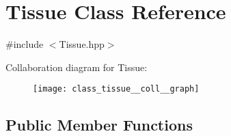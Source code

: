\hypertarget{class_tissue}{}\section{Tissue Class Reference}
\label{class_tissue}


{\ttfamily \#include $<$Tissue.\+hpp$>$}



Collaboration diagram for Tissue\+:
\nopagebreak
\begin{figure}[H]
\begin{center}
\leavevmode
\texttt{[image: class\_tissue\_\_coll\_\_graph]}
\end{center}
\end{figure}
\subsection*{Public Member Functions}

